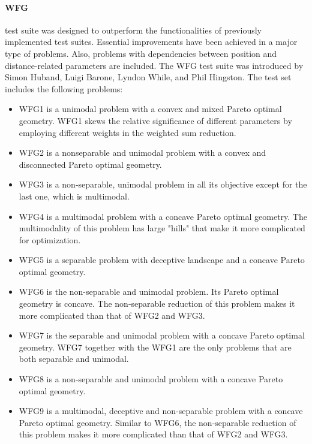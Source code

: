         \paragraph{WFG} test suite \cite{WFGref} was designed to outperform the functionalities of previously implemented test suites. Essential improvements have been achieved in a major type of problems. Also, problems with dependencies between position and distance-related parameters are included. The WFG test suite was introduced by Simon Huband, Luigi Barone, Lyndon While, and Phil Hingston. 
        The test set includes the following problems:
        \begin{itemize}
            \item WFG1 is a unimodal problem with a convex and mixed Pareto optimal geometry. WFG1 skews the relative significance of different parameters by employing different weights in the weighted sum reduction.
            \item WFG2 is a nonseparable and unimodal problem with a convex and disconnected Pareto optimal geometry.
            \item WFG3 is a non-separable, unimodal problem in all its objective except for the last one, which is multimodal.
            \item WFG4 is a multimodal problem with a concave Pareto optimal geometry. The multimodality of this problem has large "hills" that make it more complicated for optimization.
            \item WFG5 is a separable problem with deceptive landscape and a concave Pareto optimal geometry.
            \item WFG6 is the non-separable and unimodal problem. Its Pareto optimal geometry is concave. The non-separable reduction of this problem makes it more complicated than that of WFG2 and WFG3.
            \item WFG7 is the separable and unimodal problem with a concave Pareto optimal geometry. WFG7 together with the WFG1 are the only problems that are both separable and unimodal.
            \item WFG8 is a non-separable and unimodal problem with a concave Pareto optimal geometry.
            \item WFG9 is a multimodal, deceptive and non-separable problem with a concave Pareto optimal geometry. Similar to WFG6, the non-separable reduction of this problem makes it more complicated than that of WFG2 and WFG3.
        \end{itemize}


